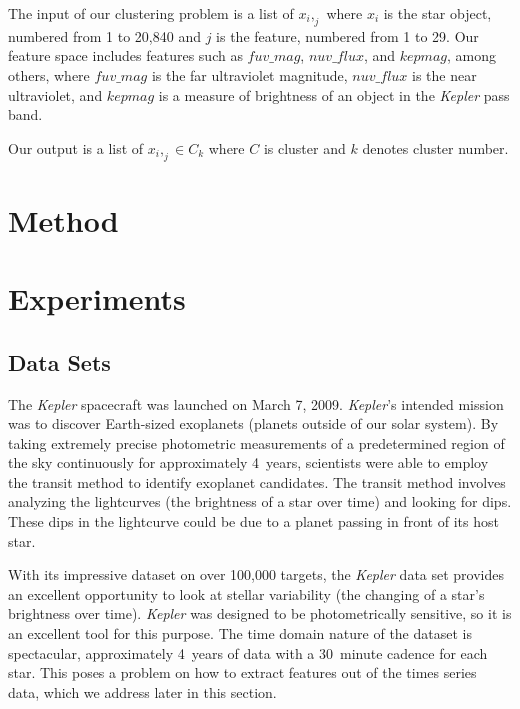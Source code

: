 \documentclass[12pt]{article}
\begin{document}

The input of our clustering problem is a list of $x_i,_j$ where $x_i$ is the star object, numbered from 1 to 20,840 and $j$ is the feature, numbered from 1 to 29.
Our feature space includes features such as $fuv\_mag$, $nuv\_flux$, and $kepmag$, among others, where $fuv\_mag$ is the far ultraviolet magnitude, $nuv\_flux$ is the near ultraviolet, and $kepmag$ is a measure of brightness of an object in the \textit{Kepler} pass band.

Our output is a list of $x_i,_j \in C_k$ where $C$ is cluster and $k$ denotes cluster number. 



\section{Method} %
\label{sec:Method}


\section{Experiments} %
\label{sec:Experiments}
\subsection{Data Sets} %
\label{sub:Data Sets}

The \textit{Kepler} spacecraft was launched on March 7, 2009.
\textit{Kepler}'s intended mission was to discover Earth-sized exoplanets (planets outside of our solar system).
By taking extremely precise photometric measurements of a predetermined region of the sky continuously for approximately 4~years, scientists were able to employ the transit method to identify exoplanet candidates.
The transit method involves analyzing the lightcurves (the brightness of a star over time) and looking for dips.
These dips in the lightcurve could be due to a planet passing in front of its host star.

With its impressive dataset on over 100,000 targets, the \textit{Kepler} data set provides an excellent opportunity to look at stellar variability (the changing of a star's brightness over time).
\textit{Kepler} was designed to be photometrically sensitive, so it is an excellent tool for this purpose.
The time domain nature of the dataset is spectacular, approximately 4~years of data with a 30~minute cadence for each star.
This poses a problem on how to extract features out of the times series data, which we address later in this section.
\end{document}
